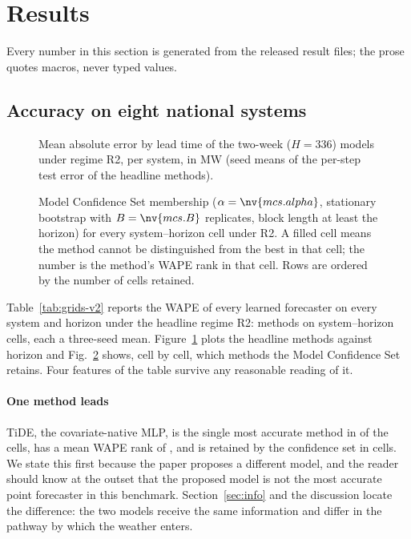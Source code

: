 \section{Results}
\label{sec:results}
Every number in this section is generated from the released result files; the prose quotes
macros, never typed values.

\subsection{Accuracy on eight national systems}
\label{sec:grids}
\begin{figure}[!t]
\centering
{}
\caption{Mean absolute error by lead time of the two-week ($H=336$) models under regime R2,
per system, in MW (seed means of the per-step test error of the headline methods).}
\label{fig:horizon}
\end{figure}
\begin{figure}[!t]
\centering
{}
\caption{Model Confidence Set membership ($\alpha=\nv{mcs.alpha}$, stationary bootstrap with
$B=\nv{mcs.B}$ replicates, block length at least the horizon) for every system--horizon cell
under R2. A filled cell means the method cannot be distinguished from the best in that cell;
the number is the method's WAPE rank in that cell. Rows are ordered by the number of cells
retained.}
\label{fig:mcs}
\end{figure}

Table~\ref{tab:grids-v2} reports the WAPE of every learned forecaster on every system and
horizon under the headline regime R2:  methods on 
system--horizon cells, each a three-seed mean. Figure~\ref{fig:horizon} plots the headline
methods against horizon and Fig.~\ref{fig:mcs} shows, cell by cell, which methods the Model
Confidence Set retains. Four features of the table survive any reasonable reading of it.

\paragraph{One method leads} TiDE, the covariate-native MLP, is the single most accurate
method in  of the  cells, has a mean WAPE rank of
, and is retained by the confidence set in
 cells. We state this first because the paper proposes a different
model, and the reader should know at the outset that the proposed model is not the most
accurate point forecaster in this benchmark. Section~\ref{sec:info} and the discussion locate
the difference: the two models receive the same information and differ in the pathway by which
the weather enters.

